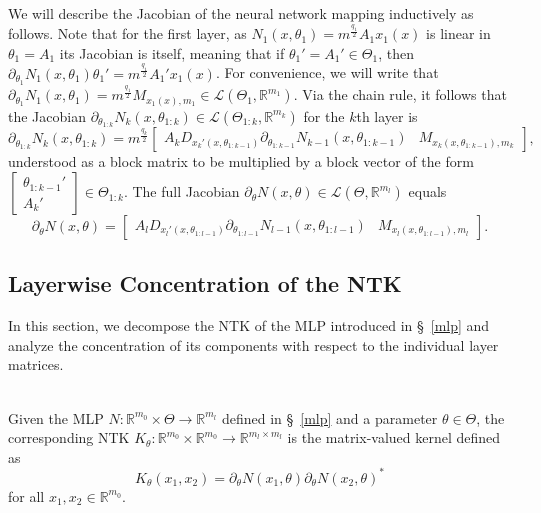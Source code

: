 \documentclass[twoside,11pt]{article}
\newcommand{\R}{\mathbb{R}}
\newcommand{\Ell}{\mathcal{L}}
\begin{document}
We will describe the Jacobian of the neural network mapping inductively as follows. Note that for the first layer, as $N_1(x,\theta_1)=m^{\frac{q_1}{2}} A_1 x_1(x)$ is linear in $\theta_1 = A_1$ its Jacobian is itself, meaning that if $\theta_1' = A_1' \in \Theta_1$, then $\partial_{\theta_1} N_1(x,\theta_1) \theta_1' = m^{\frac{q_1}{2}} A_1' x_1(x)$. For convenience, we will write that $\partial_{\theta_1} N_1(x,\theta_1) = m^{\frac{q_1}{2}} M_{x_1(x),m_1} \in \Ell(\Theta_1, \R^{m_1})$. Via the chain rule, it follows that the Jacobian $\partial_{\theta_{1:k}} N_k(x,\theta_{1:k}) \in \Ell(\Theta_{1:k}, \R^{m_k})$ for the $k$th layer is
\[
\partial_{\theta_{1:k}} N_k(x,\theta_{1:k}) = m^{\frac{q_k}{2}} \left[ \begin{array}{cc} A_k D_{x_k'(x, \theta_{1:k-1})} \partial_{\theta_{1 : k-1}} N_{k-1}(x,\theta_{1 : k-1}) & M_{x_k(x, \theta_{1:k-1}),m_k} \end{array} \right],
\]
understood as a block matrix to be multiplied by a block vector of the form $\left[ \begin{array}{c} \theta_{1:k-1}' \\ A_k' \end{array} \right] \in \Theta_{1:k}$. The full Jacobian $\partial_\theta N(x,\theta) \in \Ell(\Theta, \R^{m_l})$ equals
\begin{equation}\label{eq:jacobian}
\partial_\theta N(x,\theta) = \left[ \begin{array}{cc} A_l D_{x_l'(x, \theta_{1:l-1})} \partial_{\theta_{1 : l-1}} N_{l-1}(x,\theta_{1 : l-1}) & M_{x_l(x, \theta_{1:l-1}),m_l} \end{array} \right].
\end{equation}

\subsection{Layerwise Concentration of the NTK}\label{layerwise}

In this section, we decompose the NTK of the MLP introduced in \S~\ref{mlp} and analyze the concentration of its components with respect to the individual layer matrices.

\begin{definition}\label{def:ntk_kernel}~\\
Given the MLP $N: \R^{m_0} \times \Theta \to \R^{m_l}$ defined in \S~\ref{mlp} and a parameter $\theta \in \Theta$, the corresponding NTK $K_\theta : \R^{m_0} \times \R^{m_0} \to \R^{m_l \times m_l}$ is the matrix-valued kernel defined as 
\[
K_\theta(x_1,x_2) = \partial_\theta N(x_1,\theta) {\partial_\theta N(x_2,\theta)}^*
\]
for all $x_1, x_2 \in \R^{m_0}$.
\end{definition}
\end{document}
